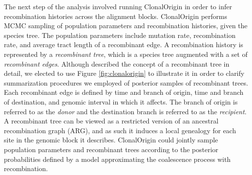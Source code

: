 \documentclass[english]{article}
\begin{document}
The next step of the analysis involved running ClonalOrigin in order to infer 
recombination histories across the alignment blocks. ClonalOrigin performs MCMC 
sampling of population parameters and recombination histories, given the 
species tree. The population parameters include mutation rate, 
recombination rate, and average tract length of a recombinant edge. A 
recombination history is represented by a \emph{recombinant tree}, which is a 
species tree augmented with a set of \emph{recombinant edges}. 
Although \citet{Didelot2010} described the concept of a recombinant tree
in detail, we elected to use Figure \ref{fig:clonalorigin} 
to illustrate it in order to clarify
summarization procedures we employed of posterior samples of recombinant trees.
Each recombinant 
edge is defined by time and branch of origin, time and branch of destination, 
and genomic interval in which it affects. The branch of origin is referred 
to as the \emph{donor} and the destination branch is referred to as the 
\emph{recipient}. A recombinant tree can be viewed as a restricted version of 
an ancestral recombination graph (ARG), and as such it induces a local 
genealogy for each site in the genomic block it describes. ClonalOrigin could
jointly sample population parameters and 
recombinant trees according to the posterior probabilities defined by a model 
approximating the coalescence process with recombination.

\end{document}
